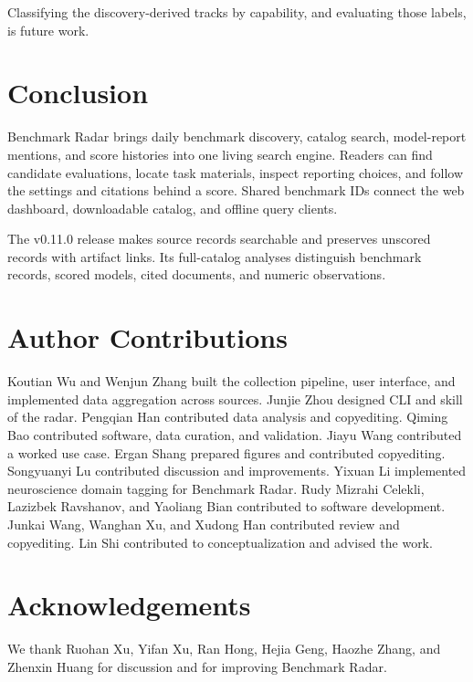 \documentclass[11pt]{article}
\newcommand{\ReportNumber}[1]{\pgfmathprintnumber[fixed,precision=0,1000 sep={,},assume math mode=true]{#1}}
\begin{document}
Classifying the \ReportNumber{\CensusUnclassified} discovery-derived tracks by capability, and evaluating those labels, is future work.

\section{Conclusion}

Benchmark Radar brings daily benchmark discovery, catalog search, model-report mentions, and score histories into one living search engine. Readers can find candidate evaluations, locate task materials, inspect reporting choices, and follow the settings and citations behind a score. Shared benchmark IDs connect the web dashboard, downloadable catalog, and offline query clients.

The v0.11.0 release makes \ReportNumber{\CensusRecords} source records searchable and preserves \CensusNoScoreWithLinks{} unscored records with artifact links. Its full-catalog analyses distinguish benchmark records, scored models, cited documents, and numeric observations.

\section*{Author Contributions}
\label{sec:author-contributions}

Koutian Wu and Wenjun Zhang built the collection pipeline, user interface, and implemented data aggregation across sources. Junjie Zhou designed CLI and skill of the radar. Pengqian Han contributed data analysis and copyediting. Qiming Bao contributed software, data curation, and validation. Jiayu Wang contributed a worked use case. Ergan Shang prepared figures and contributed copyediting. Songyuanyi Lu contributed discussion and improvements. Yixuan Li implemented neuroscience domain tagging for Benchmark Radar. Rudy Mizrahi Celekli, Lazizbek Ravshanov, and Yaoliang Bian contributed to software development. Junkai Wang, Wanghan Xu, and Xudong Han contributed review and copyediting. Lin Shi contributed to conceptualization and advised the work.

\section*{Acknowledgements}
\label{sec:acknowledgements}

We thank Ruohan Xu, Yifan Xu, Ran Hong, Hejia Geng, Haozhe Zhang, and Zhenxin Huang for discussion and for improving Benchmark Radar.
\end{document}
